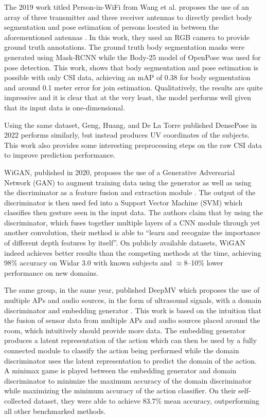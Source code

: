 The 2019 work titled Person-in-WiFi from Wang et al. proposes the use of an array of three transmitter and three receiver antennas to directly predict body segmentation and pose estimation of persons located in between the aforementioned antennas \cite{wang2019person}.
In this work, they used an RGB camera to provide ground truth annotations.
The ground truth body segmentation masks were generated using Mask-RCNN while the Body-25 model of OpenPose was used for pose detection.
This work, shows that body segmentation and pose estimation is possible with only CSI data, achieving an mAP of 0.38 for body segmentation and around 0.1 meter error for join estimation. 
Qualitatively, the results are quite impressive and it is clear that at the very least, the model performs well given that its input data is one-dimensional.

Using the same dataset, Geng, Huang, and De La Torre published DensePose in 2022 performs similarly, but instead produces UV coordinates of the subjects.
This work also provides some interesting preprocessing steps on the raw CSI data to improve prediction performance.

WiGAN, published in 2020, proposes the use of a Generative Adversarial Network (GAN) to augment training data using the generator as well as using the discriminator as a feature fusion and extraction module \cite{jiang2020wigan}.
The output of the discriminator is then used fed into a Support Vector Machine (SVM) which classifies then gesture seen in the input data.
The authors claim that by using the discriminator, which fuses together multiple layers of a CNN module through yet another convolution, their method is able to ``learn and recognize the importance of different depth features by itself''.
On publicly available datasets, WiGAN indeed achieves better results than the competing methods at the time, achieving 98\% accuracy on Widar 3.0 with known subjects and $\approx$8--10\% lower performance on new domains.

The same group, in the same year, published DeepMV which proposes the use of multiple APs and audio sources, in the form of ultrasound signals, with a domain discriminator and embedding generator \cite{xue2020deepmv}.
This work is based on the intuition that the fusion of sensor data from multiple APs and audio sources placed around the room, which intuitively should provide more data.
The embedding generator produces a latent representation of the action which can then be used by a fully connected module to classify the action being performed while the domain discriminator uses the latent representation to predict the domain of the action.
A minimax game is played between the embedding generator and domain discriminator to minimize the maximum accuracy of the domain discriminator while maximizing the minimum accuracy of the action classifier.
On their self-collected dataset, they were able to achieve 83.7\% mean accuracy, outperforming all other benchmarked methods.

